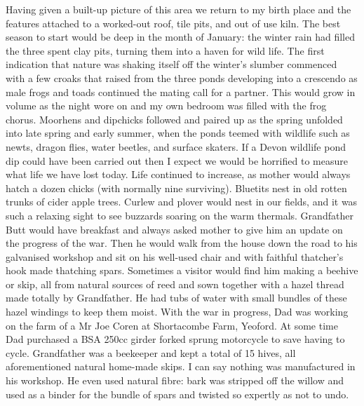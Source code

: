 Having given a built-up picture of this area we return to my birth place
and the features attached to a worked-out roof, tile pits, and out of use kiln.
The best season to start would be deep in the month of January: the winter rain
had filled the three spent clay pits, turning them into a haven for wild life.
The first indication that nature was shaking itself off the winter's slumber
commenced with a few croaks that raised from the three ponds developing into a
crescendo as male frogs and toads continued the mating call for a partner. This
would grow in volume as the night wore on and my own bedroom was filled with
the frog chorus. Moorhens and dipchicks followed and paired up as the spring
unfolded into late spring and early summer, when the ponds teemed with wildlife
such as newts, dragon flies, water beetles, and surface skaters. If a Devon
wildlife pond dip could have been carried out then I expect we would be
horrified to measure what life we have lost today. Life continued to increase,
as mother would always hatch a dozen chicks (with normally nine surviving).
Bluetits nest in old rotten trunks of cider apple trees. Curlew and plover
would nest in our fields, and it was such a relaxing sight to see buzzards
soaring on the warm thermals. Grandfather Butt would have breakfast and always
asked mother to give him an update on the progress of the war. Then he would
walk from the house down the road to his galvanised workshop and sit on his
well-used chair and with faithful thatcher's hook made thatching spars.
Sometimes a visitor would find him making a beehive or skip, all from natural
sources of reed and sown together with a hazel thread made totally by
Grandfather. He had tubs of water with small bundles of these hazel windings to
keep them moist. With the war in progress, Dad was working on the farm of a Mr
Joe Coren at Shortacombe Farm, Yeoford. At some time Dad purchased a BSA 250cc
girder forked sprung motorcycle to save having to cycle. Grandfather was a
beekeeper and kept a total of 15 hives, all aforementioned natural home-made
skips. I can say nothing was manufactured in his workshop. He even used natural
fibre: bark was stripped off the willow and used as a binder for the bundle of
spars and twisted so expertly as not to undo.
